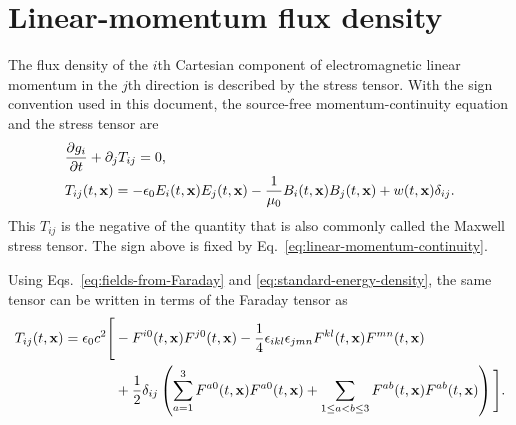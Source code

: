 \section{Linear-momentum flux density}

The flux density of the $i$th Cartesian component of electromagnetic linear
momentum in the $j$th direction is described by the stress tensor.  With the
sign convention used in this document, the source-free momentum-continuity
equation and the stress tensor are
\begin{align}
  &  \frac{\partial g_i}{\partial t}+\partial_jT_{ij}=0,
  \label{eq:linear-momentum-continuity}\\
  &T_{ij}(t,{\bf x})
  =-\epsilon_0E_i(t,{\bf x})E_j(t,{\bf x})
  -\frac1{\mu_0}B_i(t,{\bf x})B_j(t,{\bf x})
  +w(t,{\bf x})\delta_{ij}.
  \label{eq:linear-momentum-flux-tensor}
\end{align}
This $T_{ij}$ is the negative of the quantity that is also commonly called
the Maxwell stress tensor.  The sign above is fixed by
Eq.~\eqref{eq:linear-momentum-continuity}.

Using Eqs.~\eqref{eq:fields-from-Faraday} and
\eqref{eq:standard-energy-density}, the same tensor can be written in terms of
the Faraday tensor as
\begin{align}
  T_{ij}(t,{\bf x})
  =\epsilon_0c^2\Bigg[
    &-F^{i0}(t,{\bf x})F^{j0}(t,{\bf x})
    -\frac14\epsilon_{ikl}\epsilon_{jmn}
    F^{kl}(t,{\bf x})F^{mn}(t,{\bf x})\nonumber\\
    &+\frac12\delta_{ij}\left(
      \sum_{a=1}^{3}F^{a0}(t,{\bf x})F^{a0}(t,{\bf x})
      +\sum_{1\leq a<b\leq3}F^{ab}(t,{\bf x})F^{ab}(t,{\bf x})
  \right)\Bigg].
  \label{eq:linear-momentum-flux-tensor-Faraday}
\end{align}

